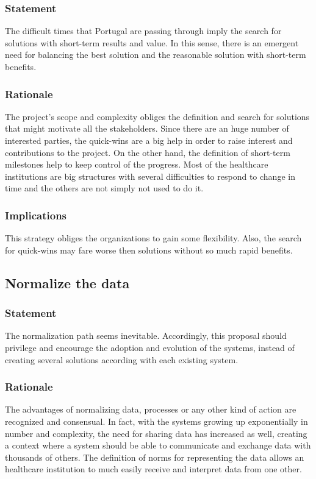 \subsubsection{Statement}
The difficult times that Portugal are passing through imply the search for solutions with short-term results and value. In this sense, there is an emergent need for balancing the best solution and the reasonable solution with short-term benefits.
\subsubsection{Rationale}
The project's scope and complexity obliges the definition and search for solutions that might motivate all the stakeholders. Since there are an huge number of interested parties, the quick-wins are a big help in order to raise interest and contributions to the project. On the other hand, the definition of short-term milestones help to keep control of the progress. Most of the healthcare institutions are big structures with several difficulties to respond to change in time and the others are not simply not used to do it.
\subsubsection{Implications}
This strategy obliges the organizations to gain some flexibility. Also, the search for quick-wins may fare worse then solutions without so much rapid benefits. 


\subsection{Normalize the data}

\subsubsection{Statement}
The normalization path seems inevitable. Accordingly, this proposal should privilege and encourage the adoption and evolution of the systems, instead of creating several solutions according with each existing system.
\subsubsection{Rationale}
The advantages of normalizing data, processes or any other kind of action are recognized and consensual. In fact, with the systems growing up exponentially in number and complexity, the need for sharing data has increased as well, creating a context where a system should be able to communicate and exchange data with thousands of others. The definition of norms for representing the data allows an healthcare institution to much easily receive and interpret data from one other.
